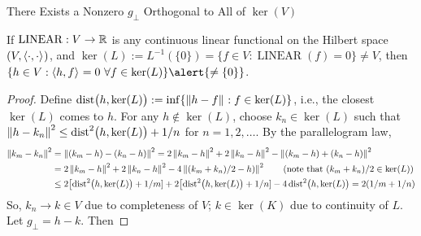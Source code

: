 \documentclass[10pt,compress,xcolor={usenames,dvipsnames},aspectratio=169]{beamer}
\DeclareMathOperator{\LIN}{LINEAR}
\begin{document}
\begin{frame}[label = lemma]{There Exists a Nonzero $g_\perp$ Orthogonal to All of $\ker(V)$ \hyperlink{generalRiesz}{}}
	\begin{lemma}
		If $\LIN: V \to \reals$ is any \alert{continuous} linear functional on the Hilbert space $(V,\left \langle \cdot, \cdot \right \rangle_{{}})$, and $\ker(L) := L^{-1}(\{0\}) = \{f \in V : \LIN(f) = 0\} \ne V$,
		then $ \{ h \in V : \ip{h}{f} = 0 \ \forall f \in \ker(L)\} \alert{\ne \{0\}}$.
	\end{lemma}
	\begin{proof}
		Define $\operatorname{dist}\bigl(h,\ker(L)\bigr) := \inf\{ \left \lVert h - f \right \rVert_{{}} : f \in \ker(L)\}$, i.e., the closest $\ker(L)$ comes to $h$.  For any $h \notin \ker(L)$, choose $k_n \in \ker(L)$ such that $\left \lVert h - k_n \right \rVert_{{}}^2 \le \operatorname{dist}^2\bigl(h,\ker(L)\bigr) + 1/n$ for $n = 1, 2, \ldots$.  By the \alert{parallelogram law}, 
		\begin{align*}
			\left \lVert k_m - k_n \right \rVert_{{}}^2 &= \left \lVert (k_m - h) - (k_n-h)  \right \rVert_{{}}^2 = 2\left \lVert k_m - h \right \rVert_{{}}^2 + 2\left \lVert k_n-h \right \rVert_{{}}^2 - \left \lVert (k_m - h) + (k_n-h)  \right \rVert_{{}}^2 \\
			&= 2\left \lVert k_m - h \right \rVert_{{}}^2 + 2\left \lVert k_n-h \right \rVert_{{}}^2 - 4\left \lVert (k_m+k_n)/2-h)  \right \rVert_{{}}^2 \qquad \text{(note that $(k_m+k_n)/2 \in \ker(L)$)}\\
			& \le 2\bigl[\operatorname{dist}^2\bigl(h,\ker(L)\bigr) + 1/m] + 2\bigl[\operatorname{dist}^2\bigl(h,\ker(L)\bigr) + 1/n] - 4\operatorname{dist}^2\bigl(h,\ker(L)\bigr) = 2(1/m+1/n)
		\end{align*}
		So, $k_n \to k \in V$ due to completeness of $V$; $k \in \ker(K)$ due to continuity of $L$. Let $g_\perp = h - k$.  Then 
	\end{proof}
\end{frame}
\end{document}
